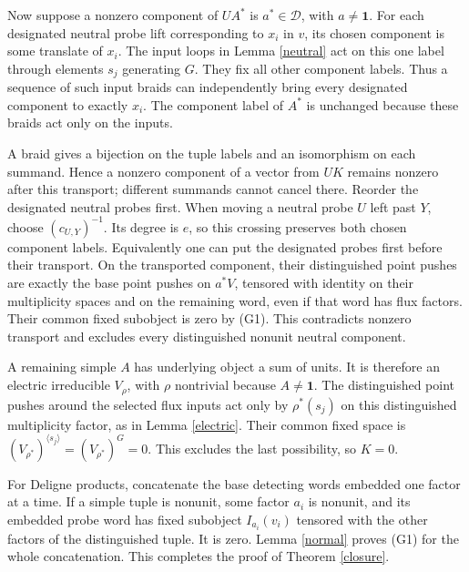 \documentclass[10pt]{amsart}
\newcommand{\one}{\mathbf1}\newcommand{\C}{\mathcal C}
\newcommand{\D}{\mathcal D}\newcommand{\E}{\mathcal E}
\begin{document}
Now suppose a nonzero component of $UA^*$ is $a^*\in\D$,
with $a\ne\one$. For each designated neutral probe lift
corresponding to $x_i$ in $v$, its chosen component is some
translate of $x_i$. The input loops in Lemma \ref{neutral}
act on this one label through elements $s_j$ generating $G$.
They fix all other component labels. Thus a sequence of such
input braids can independently bring every designated
component to exactly $x_i$.
The component label of $A^*$ is unchanged because these
braids act only on the inputs.

A braid gives a bijection on the tuple labels and an
isomorphism on each summand. Hence a nonzero component of
a vector from $UK$ remains nonzero after this transport;
different summands cannot cancel there.
Reorder the designated neutral probes first.
When moving a neutral probe $U$ left past $Y$, choose
$(c_{U,Y})^{-1}$. Its degree is $e$, so this crossing
preserves both chosen component labels. Equivalently one
can put the designated probes first before their transport.
On the transported component, their distinguished point
pushes are exactly the base point pushes on $a^*V$,
tensored with identity on their multiplicity spaces and
on the remaining word, even if that word has flux factors.
Their common fixed subobject is zero by (G1).
This contradicts nonzero transport and excludes every
distinguished nonunit neutral component.

A remaining simple $A$ has underlying object a sum of units.
It is therefore an electric irreducible $V_\rho$, with
$\rho$ nontrivial because $A\ne\one$.
The distinguished point pushes around the selected flux
inputs act only by $\rho^*(s_j)$ on this distinguished
multiplicity factor, as in Lemma \ref{electric}.
Their common fixed space is
$(V_{\rho^*})^{\langle s_j\rangle}=(V_{\rho^*})^G=0$.
This excludes the last possibility, so $K=0$.

For Deligne products, concatenate the base detecting words
embedded one factor at a time. If a simple tuple is nonunit,
some factor $a_i$ is nonunit, and its embedded probe word
has fixed subobject $I_{a_i}(v_i)$ tensored with the other
factors of the distinguished tuple. It is zero. Lemma
\ref{normal} proves (G1) for the whole concatenation.
This completes the proof of Theorem \ref{closure}.
\end{document}
